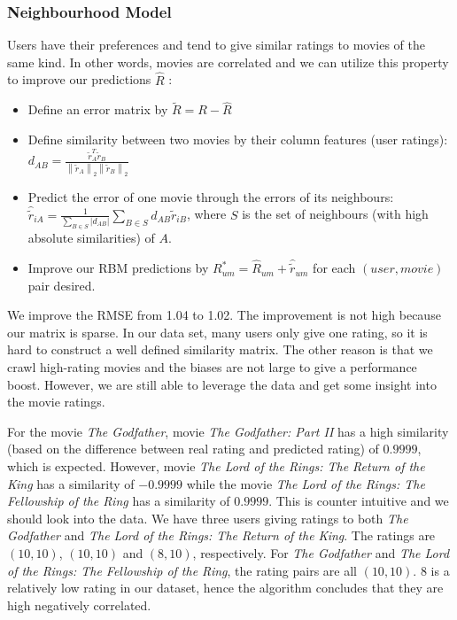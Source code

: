 \begin{CJK*}{UTF8}{gbsn}
\subsubsection{Neighbourhood Model}
Users have their preferences and tend to give similar ratings to movies of the same kind. In other words, movies are correlated and we can utilize this property to improve our predictions $ \hat{R} $ :
\begin{itemize}
    \item Define an error matrix by $ \widetilde{R} = R - \hat{R} $
    \item Define similarity between two movies by their column features (user ratings): $ d_{A B}=\frac{\tilde{r}_{A}^{T} \widetilde{r}_{B}}{\left\|\widetilde{r}_{A}\right\|_{2}\left\|\widetilde{r}_{B}\right\|_{2}} $
    \item Predict the error of one movie through the errors of its neighbours: $ \hat{\tilde{r}}_{i A}=\frac{1}{\sum_{B \in S}\left|d_{A B}\right|} \sum_{B \in S} d_{A B} \widetilde{r}_{i B}  $, where $ S $ is the set of neighbours (with high absolute similarities) of $ A $.
    \item Improve our RBM predictions by $ R_{u m}^{*}=\hat{R}_{u m}+\hat{\tilde{r}}_{u m} $ for each $ (user, movie) $ pair desired.
\end{itemize}
We improve the RMSE from 1.04 to 1.02. The improvement is not high because our matrix is sparse. In our data set, many users only give one rating, so it is hard to construct a well defined similarity matrix. The other reason is that we crawl high-rating movies and the biases are not large to give a performance boost. However, we are still able to leverage the data and get some insight into the movie ratings. 

For the movie \textit{The Godfather}, movie \textit{The Godfather: Part II} has a high similarity (based on the difference between real rating and predicted rating) of $ 0.9999 $, which is expected. However, movie \textit{The Lord of the Rings: The Return of the King} has a similarity of $ -0.9999 $ while the movie \textit{The Lord of the Rings: The Fellowship of the Ring} has a similarity of $ 0.9999 $. This is counter intuitive and we should look into the data. We have three users giving ratings to both \textit{The Godfather} and \textit{The Lord of the Rings: The Return of the King}. The ratings are $ (10, 10) $, $ (10, 10) $ and $ (8, 10) $, respectively. For \textit{The Godfather} and \textit{The Lord of the Rings: The Fellowship of the Ring}, the rating pairs are all $ (10, 10) $. 8 is a relatively low rating in our dataset, hence the algorithm concludes that they are high negatively correlated.


\end{CJK*}
